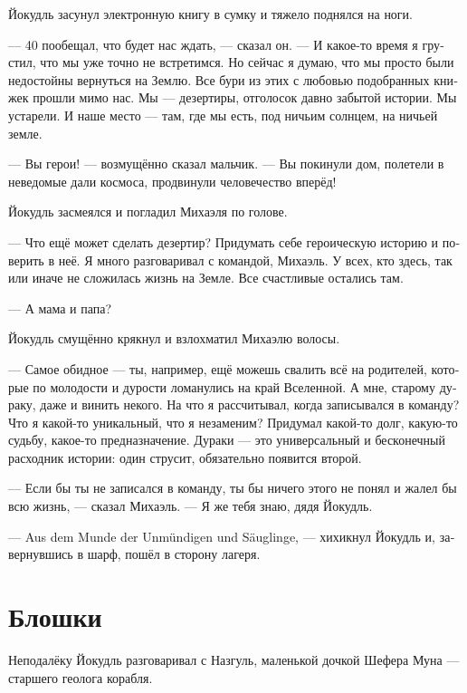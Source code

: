 \documentclass[a4paper,12pt,fleqn]{book}\usepackage{polyglossia}\setdefaultlanguage[babelshorthands=true]{russian}\setotherlanguage{english}\defaultfontfeatures{Ligatures=TeX,Mapping=tex-text}\usepackage{xcolor}\newcommand{\ml}[3]{#2}
\begin{document}
Йокудль засунул электронную книгу в сумку и тяжело поднялся на ноги.

--- 40 пообещал, что будет нас ждать, --- сказал он.
--- И какое-то время я грустил, что мы уже точно не встретимся.
Но сейчас я думаю, что мы просто были недостойны вернуться на Землю.
Все бури из этих с любовью подобранных книжек прошли мимо нас.
\ml{$0$}
{Мы --- дезертиры, отголосок давно забытой истории.}
{We are deserters, an echo of a story long forgotten.}
\ml{$0$}
{Мы устарели.}
{We are outdated.}
\ml{$0$}
{И наше место --- там, где мы есть, под ничьим солнцем, на ничьей земле.}
{Our place is where we are---under a no one's sun, on a no one's ground.''}

--- Вы герои! --- возмущённо сказал мальчик.
--- Вы покинули дом, полетели в неведомые дали космоса, продвинули человечество вперёд!

Йокудль засмеялся и погладил Михаэля по голове.

\ml{$0$}
{--- Что ещё может сделать дезертир?}
{``What else a deserter could say?}
Придумать себе героическую историю и поверить в неё.
Я много разговаривал с командой, Михаэль.
У всех, кто здесь, так или иначе не сложилась жизнь на Земле.
\ml{$0$}
{Все счастливые остались там.}
{All the happy people are still there.''}

--- А мама и папа?

Йокудль смущённо крякнул и взлохматил Михаэлю волосы.

--- Самое обидное --- ты, например, ещё можешь свалить всё на родителей, которые по молодости и дурости ломанулись на край Вселенной.
\ml{$0$}
{А мне, старому дураку, даже и винить некого.}
{An old fool of me has no one to blame.}
На что я рассчитывал, когда записывался в команду?
Что я какой-то уникальный, что я незаменим?
Придумал какой-то долг, какую-то судьбу, какое-то предназначение.
Дураки --- это универсальный и бесконечный расходник истории: один струсит, обязательно появится второй.

--- Если бы ты не записался в команду, ты бы ничего этого не понял и жалел бы всю жизнь, --- сказал Михаэль.
--- Я же тебя знаю, дядя Йокудль.

--- Aus dem Munde der Unmündigen und Säuglinge, --- хихикнул Йокудль и, завернувшись в шарф, пошёл в сторону лагеря.

\section{Блошки}

\ml{$0$}
{Неподалёку Йокудль разговаривал с Назгуль, маленькой дочкой Шефера Муна --- старшего геолога корабля.}
{Near of them Jökull was talking with Nasgul, little daughter of Schäfer Mun, senior geologist of the ship.}
\end{document}
